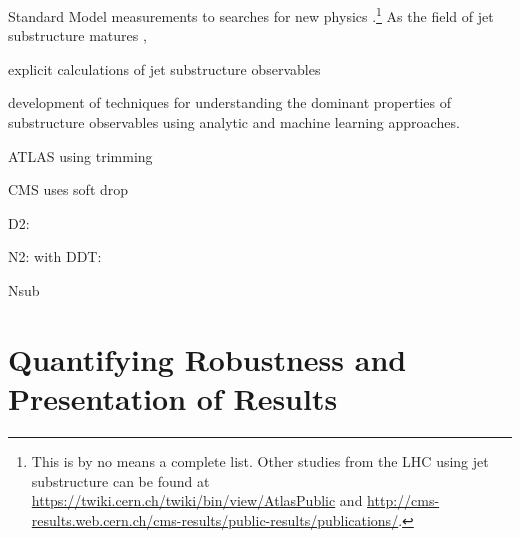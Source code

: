 \documentclass[11pt,letterpaper]{article}
\begin{document}
 Standard Model measurements \cite{Chatrchyan:2012sn,CMS:2013cda,Aad:2015cua,Aad:2015lxa,ATLAS-CONF-2015-035,Aad:2015rpa,Aad:2015hna,ATLAS-CONF-2016-002,ATLAS-CONF-2016-039,ATLAS-CONF-2016-034,CMS-PAS-TOP-16-013,CMS-PAS-HIG-16-004} to searches for new physics \cite{CMS:2011bqa,Fleischmann:2013woa,Pilot:2013bla,TheATLAScollaboration:2013qia,Chatrchyan:2012ku,CMS-PAS-B2G-14-001,CMS-PAS-B2G-14-002,Khachatryan:2015axa,Khachatryan:2015bma,Aad:2015owa,Aaboud:2016okv,Aaboud:2016trl,Aaboud:2016qgg,ATLAS-CONF-2016-055,ATLAS-CONF-2015-071,ATLAS-CONF-2015-068,CMS-PAS-EXO-16-037,CMS-PAS-EXO-16-040,Khachatryan:2016mdm,CMS-PAS-HIG-16-016,CMS-PAS-B2G-15-003,CMS-PAS-EXO-16-017}.\footnote{This is by no means a complete list.  Other studies from the LHC using jet substructure can be found at \url{https://twiki.cern.ch/twiki/bin/view/AtlasPublic} and \url{http://cms-results.web.cern.ch/cms-results/public-results/publications/}.}  As the field of jet substructure matures \cite{Abdesselam:2010pt,Altheimer:2012mn,Altheimer:2013yza,Adams:2015hiv}, 
 
 
 
  explicit calculations of jet substructure observables \cite{Feige:2012vc,Field:2012rw,Dasgupta:2013ihk,Dasgupta:2013via,Larkoski:2014pca,Dasgupta:2015yua,Seymour:1997kj,Li:2011hy,Larkoski:2012eh,Jankowiak:2012na,Chien:2014nsa,Chien:2014zna,Isaacson:2015fra,Krohn:2012fg,Waalewijn:2012sv,Larkoski:2014tva,Procura:2014cba,Bertolini:2015pka,Bhattacherjee:2015psa,Larkoski:2015kga,Dasgupta:2015lxh,Frye:2016okc,Frye:2016aiz,Kang:2016ehg,Hornig:2016ahz} 
  \cite{Marzani:2017mva}
  
   development of techniques for understanding the dominant properties of substructure observables using analytic \cite{Walsh:2011fz,Larkoski:2014gra,Larkoski:2014zma} and machine learning \cite{Cogan:2014oua,deOliveira:2015xxd,Almeida:2015jua,Baldi:2016fql,Guest:2016iqz,Conway:2016caq,Barnard:2016qma} approaches.


ATLAS using trimming \cite{Krohn:2009th}

CMS uses soft drop\cite{Larkoski:2014wba}

D2:\cite{Larkoski:2015kga}\cite{Larkoski:2014gra}

N2:\cite{Moult:2016cvt}
with DDT:\cite{Dolen:2016kst}

Nsub\cite{Thaler:2010tr}\cite{Thaler:2011gf}

\section{Quantifying Robustness and Presentation of Results}
\end{document}
